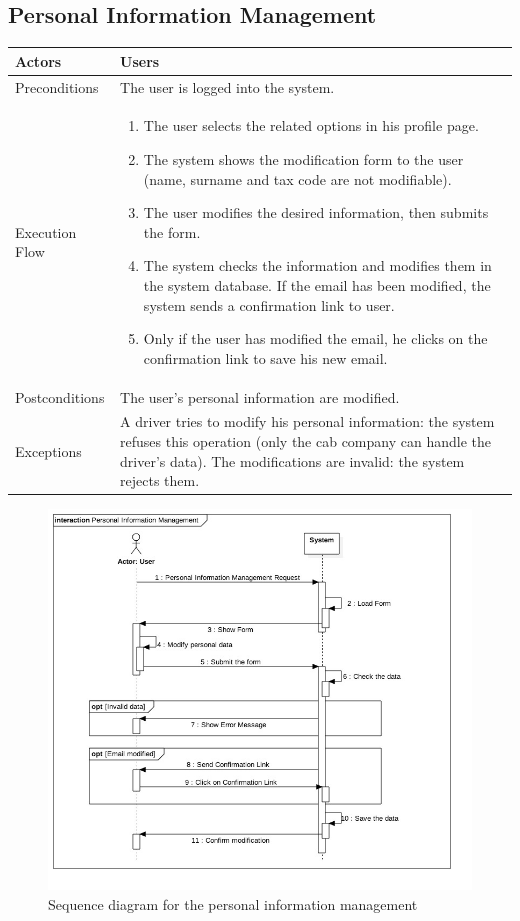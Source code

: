 \subsection{Personal Information Management}
\begin{tabular}{lp{8cm}}
	\hline 
	Actors & Users  \\ \hline
	Preconditions & The user is logged into the system.  \\ \hline
	Execution Flow &  \begin{enumerate}
					\item The user selects the related options in his profile page.
					\item The system shows the modification form to the user (name, surname and tax code are not modifiable).
					\item The user modifies the desired information, then submits the form.
					\item The system checks the information and modifies them in the system database. If the email has been modified, the system sends a confirmation link to user.
					\item Only if the user has modified the email, he clicks on the confirmation link to save his new email.
				\end{enumerate}
	 \\ \hline
	 Postconditions & The user's personal information are modified. \\ \hline
	 Exceptions &  A driver tries to modify his personal information: the system refuses this operation (only the cab company can handle the driver's data).
The modifications are invalid: the system rejects them.\\ \hline
\end{tabular}

\clearpage

\begin{figure}
	\centerline{\includegraphics[width=\paperwidth]{./figures/SD_PersonalInformationManagement.jpg}}
	\caption{Sequence diagram for the personal information management}
\end{figure}

